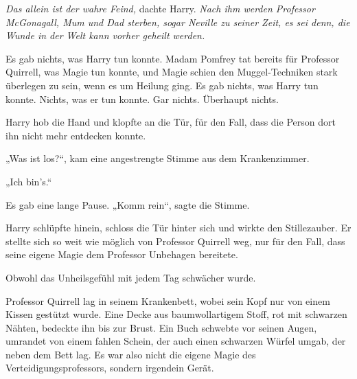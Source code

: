 \emph{Das allein ist der wahre Feind,} dachte Harry. \emph{Nach ihm werden Professor McGonagall, Mum und Dad sterben, sogar Neville zu seiner Zeit, es sei denn, die Wunde in der Welt kann vorher geheilt werden.}

Es gab nichts, was Harry tun konnte. Madam Pomfrey tat bereits für Professor Quirrell, was Magie tun konnte, und Magie schien den Muggel-Techniken stark überlegen zu sein, wenn es um Heilung ging.
Es gab nichts, was Harry tun konnte. Nichts, was er tun konnte. Gar nichts. Überhaupt nichts.

\later

Harry hob die Hand und klopfte an die Tür, für den Fall, dass die Person dort ihn nicht mehr entdecken konnte.

„Was ist los?“, kam eine angestrengte Stimme aus dem Krankenzimmer.

„Ich bin’s.“

Es gab eine lange Pause.
„Komm rein“, sagte die Stimme.

Harry schlüpfte hinein, schloss die Tür hinter sich und wirkte den Stillezauber. Er stellte sich so weit wie möglich von Professor Quirrell weg, nur für den Fall, dass seine eigene Magie dem Professor Unbehagen bereitete.

Obwohl das Unheilsgefühl mit jedem Tag schwächer wurde.

Professor Quirrell lag in seinem Krankenbett, wobei sein Kopf nur von einem Kissen gestützt wurde. Eine Decke aus baumwollartigem Stoff, rot mit schwarzen Nähten, bedeckte ihn bis zur Brust. Ein Buch schwebte vor seinen Augen, umrandet von einem fahlen Schein, der auch einen schwarzen Würfel umgab, der neben dem Bett lag. Es war also nicht die eigene Magie des Verteidigungsprofessors, sondern irgendein Gerät.

